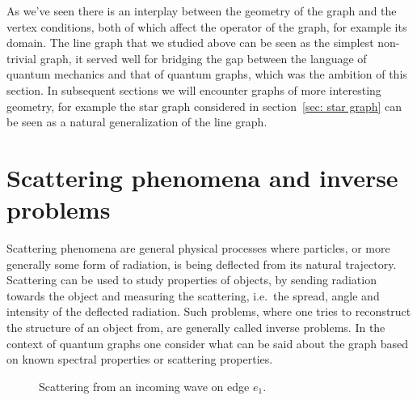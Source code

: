 As we've seen there is an interplay between the geometry of the graph and the vertex conditions, both of which affect the operator of the graph, for example its domain. The line graph that we studied above can be seen as the simplest non-trivial graph, it served well for bridging the gap between the language of quantum mechanics and that of quantum graphs, which was the ambition of this section. In subsequent sections we will encounter graphs of more interesting geometry, for example the star graph considered in section~\ref{sec: star graph} can be seen as a natural generalization of the line graph.




\section{Scattering phenomena and inverse problems}\label{sec: scattering phenomena}

Scattering phenomena are general physical processes where particles, or more generally some form of radiation, is being deflected from its natural trajectory. Scattering can be used to study properties of objects, by sending radiation towards the object and measuring the scattering, i.e.\ the spread, angle and intensity of the deflected radiation. Such problems, where one tries to reconstruct the structure of an object from, are generally called inverse problems. In the context of quantum graphs one consider what can be said about the graph based on known spectral properties or scattering properties.

\begin{figure}[h]
  \centering
  \caption{Scattering from an incoming wave on edge $e_1$.}
  \label{fig: scattering graph}
\end{figure}

